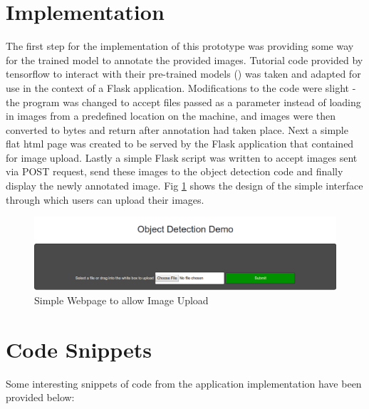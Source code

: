 \documentclass[12pt]{report}
\begin{document}
\section{Implementation}
\begin{flushleft}
The first step for the implementation of this prototype was providing some way for the trained model to annotate the provided images. Tutorial code provided by tensorflow to interact with their pre-trained models (\cite{tensorflowcode}) was taken and adapted for use in the context of a Flask application. Modifications to the code were slight - the program was changed to accept files passed as a parameter instead of loading in images from a predefined location on the machine, and images were then converted to bytes and return after annotation had taken place. Next a simple flat html page was created to be served by the Flask application that contained for image upload. Lastly a simple Flask script was written to accept images sent via POST request, send these images to the object detection code and finally display the newly annotated image. Fig \ref{fig:index} shows the design of the simple interface through which users can upload their images.
\end{flushleft}

\vspace{0.5cm}
\begin{figure}[ht!]
	\centering
	\includegraphics[width=15cm]{index}
	\caption{Simple Webpage to allow Image Upload}
	\label{fig:index}
\end{figure}

\section{Code Snippets}
\begin{flushleft}
Some interesting snippets of code from the application implementation have been provided below:
\end{flushleft}
\end{document}
